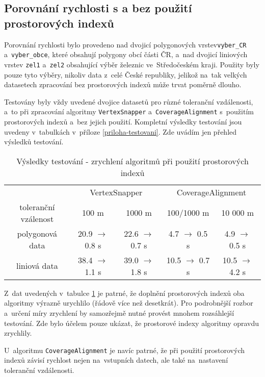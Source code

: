 \subsection{Porovnání rychlosti s a bez použití prostorových indexů}
\label{problemy-test}
Porovnání rychlosti bylo provedeno nad dvojicí polygonových vrstev\linebreak[5] 
\texttt{vyber\_CR} a~\texttt{vyber\_obce}, které obsahují polygony obcí části 
ČR, a~nad dvojicí li\-niových vrstev \texttt{zel1} a~\texttt{zel2} obsahující 
výběr železnic ve~Středočeském kraji. Použity byly pouze tyto výběry, nikoliv 
data z~celé České republiky, jelikož na~tak velkých datasetech zpracování 
bez prostorových indexů může trvat poměrně dlouho.

Testovány byly vždy uvedené dvojice datasetů pro různé toleranční vzdálenosti,
a~to při zpracování algoritmy \texttt{Vertex\-Snapper} a~\texttt{Coverage\-Alignment}
s~použitím prostorových indexů a~bez jejich použití. Kompletní výsledky testování 
jsou uvedeny v~tabulkách v~příloze \ref{priloha-testovani}. Zde uvádím jen přehled 
výsledků testování.

\begin{table}[H]
 \centering
  \caption[Výsledky testování]{Výsledky testování - zrychlení algoritmů 
	  při použití prostorových indexů}
\begin{tabular}{|c|cc|cc|}
\hline
  & \multicolumn{2}{|c}{VertexSnapper} & \multicolumn{2}{|c|}{CoverageAlignment} \\
 toleranční vzálenost & 100 m & 1000 m & 100/1000 m & 10 000 m \\
\hline
\hline
 polygonová data & 20.9 $\rightarrow$ 0.8 s& 22.6 $\rightarrow$ 0.7 s& 
 4.7 $\rightarrow$ 0.5 s& 4.9 $\rightarrow$ 0.5 s\\
 liniová data & 38.4 $\rightarrow$ 1.1 s& 39.0 $\rightarrow$ 1.8 s& 
 10.5 $\rightarrow$ 0.7 s& 10.5 $\rightarrow$ 4.2 s\\
\hline
\end{tabular}
  \label{tab:vysledky}
\end{table}


Z~dat uvedených v~tabulce \ref{tab:vysledky} je patrné, že doplnění 
prostorových indexů oba algoritmy výrazně urychlilo (řádově více než 
desetkrát). Pro podrobnější rozbor a~určení míry zrychlení by 
samozřejmě nutné provést mnohem rozsáhlejší testování. Zde bylo účelem 
pouze ukázat, že prostorové indexy algoritmy opravdu zrychlily.

U~algoritmu \texttt{Coverage\-Alignment} je navíc patrné,
že při použití prostorových indexů závisí rychlost nejen
na~vstupních datech, ale také na~nastavení toleranční 
vzdálenosti. %

